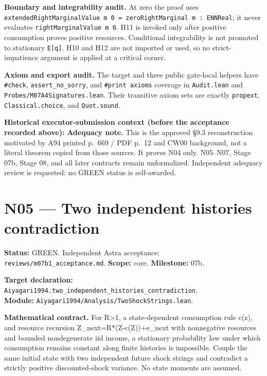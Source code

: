 \documentclass[
  11pt,
]{article}
\let\LedgerOriginalTexttt\texttt
\renewcommand{\texttt}[1]{{\small\LedgerOriginalTexttt{#1}}}
\begin{document}
\textbf{Boundary and integrability audit.} At zero the proof uses
\texttt{extendedRightMarginalValue\ m\ 0\ =\ zeroRightMarginal\ m\ :\ ENNReal};
it never evaluates \texttt{rightMarginalValue\ m\ 0}. H11 is invoked
only after positive consumption proves positive resources. Conditional
integrability is not promoted to stationary \texttt{E{[}q{]}}. H10 and
H12 are not imported or used, so no strict-impatience argument is
applied at a critical corner.

\textbf{Axiom and export audit.} The target and three public gate-local
helpers have \texttt{\#check}, \texttt{assert\_no\_sorry}, and
\texttt{\#print\ axioms} coverage in \texttt{Audit.lean} and
\texttt{Probes/M07A4Signatures.lean}. Their transitive axiom sets are
exactly \texttt{propext}, \texttt{Classical.choice}, and
\texttt{Quot.sound}.

\textbf{Historical executor-submission context (before the acceptance
recorded above):} \textbf{Adequacy note.} This is the approved §9.3
reconstruction motivated by A94 printed p.~669 / PDF p.~12 and CW00
background, not a literal theorem copied from those sources. It proves
N04 only. N05--N07, Stage 07b, Stage 08, and all later contracts remain
unformalized. Independent adequacy review is requested; no GREEN status
is self-awarded.

\section{N05 --- Two independent histories
contradiction}\label{n05-two-independent-histories-contradiction}

\textbf{Status:} GREEN. Independent Astra acceptance:
\texttt{reviews/m07b1\_acceptance.md}. \textbf{Scope:} core.
\textbf{Milestone:} 07b.

\textbf{Target declaration:}
\texttt{Aiyagari1994.two\_independent\_histories\_contradiction}.\\
\textbf{Module:} \texttt{Aiyagari1994/Analysis/TwoShockStrings.lean}.

\textbf{Mathematical contract.} For R\textgreater1, a state-dependent
consumption rule c(z), and resource recursion Z\_next=R*(Z-c(Z))+e\_next
with nonnegative resources and bounded nondegenerate iid income, a
stationary probability law under which consumption remains constant
along finite histories is impossible. Couple the same initial state with
two independent future shock strings and contradict a strictly positive
discounted-shock variance. No state moments are assumed.
\end{document}
